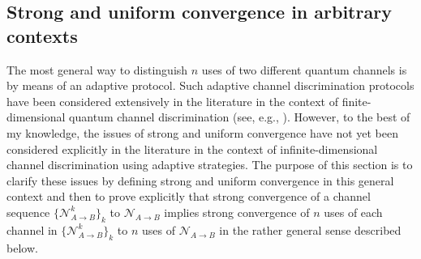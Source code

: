 \documentclass[apsrev,twocolumn]{revtex4-1}%
\begin{document}
\subsection{Strong and uniform convergence in arbitrary contexts}

\label{sec:strong-arbitrary}The most general way to distinguish $n$ uses of
two different quantum channels is by means of an adaptive protocol. Such
adaptive channel discrimination protocols have been considered extensively in
the literature in the context of finite-dimensional quantum channel
discrimination (see, e.g., \cite{WY06,CDP08,DFY09,HHLW10,CMW14,TW16}).
However, to the best of my knowledge, the issues of strong and uniform
convergence have not yet been considered explicitly in the literature in the
context of infinite-dimensional channel discrimination using adaptive
strategies. The purpose of this section is to clarify these issues by defining
strong and uniform convergence in this general context and then to prove
explicitly that strong convergence of a channel sequence $\{\mathcal{N}%
_{A\rightarrow B}^{k}\}_{k}$ to $\mathcal{N}_{A\rightarrow B}$ implies strong
convergence of $n$ uses of each channel in $\{\mathcal{N}_{A\rightarrow B}%
^{k}\}_{k}$ to $n$ uses of $\mathcal{N}_{A\rightarrow B}$ in the rather
general sense described below.
\end{document}
